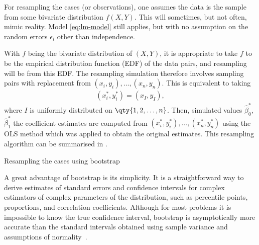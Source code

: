 For resampling the cases (or observations), one assumes the data is the sample from some bivariate distribution $f(X, Y)$. This will sometimes, but not often, mimic reality. Model \eqref{eq:lm-model} still applies, but with no assumption on the random errors $\epsilon_{i}$ other than independence.

With $f$ being the bivariate distribution of $(X, Y)$, it is appropriate to take $f$ to be the empirical distribution function (EDF) of the data pairs, and resampling will be from this EDF. The resampling simulation therefore involves sampling pairs with replacement from $(x_{i} , y_{i}), \dots , (x_{n} , y_{n})$. This is equivalent to taking
\begin{align}
	(x^{\ast}_{i} , y^{\ast}_{i}) = (x_{I} , y_{I}),
\end{align}
where $I$ is uniformly distributed on $\qty{1, 2, \dots, n}$. Then, simulated values $\hat{\beta}_{0}^{\ast}$, $\hat{\beta}_{1}^{\ast}$ the coefficient estimates are computed from $(x_{i}^{\ast} , y_{i}^{\ast}), \dots , (x_{n}^{\ast} , y_{n}^{\ast})$ using the OLS method which was applied to obtain the original estimates. This resampling algorithm can be summarised in .

\IncMargin{1em}
\begin{algorithm}[H]
	\caption{Resampling the cases using bootstrap}
	\label{alg:bootstrap-theory}
	\DontPrintSemicolon
\end{algorithm}
\DecMargin{1em}

A great advantage of bootstrap is its simplicity. It is a straightforward way to derive estimates of standard errors and confidence intervals for complex estimators of complex parameters of the distribution, such as percentile points, proportions, and correlation coefficients. %
Although for most problems it is impossible to know the true confidence interval, bootstrap is asymptotically more accurate than the standard intervals obtained using sample variance and assumptions of normality~\cite{Efron1993}.

